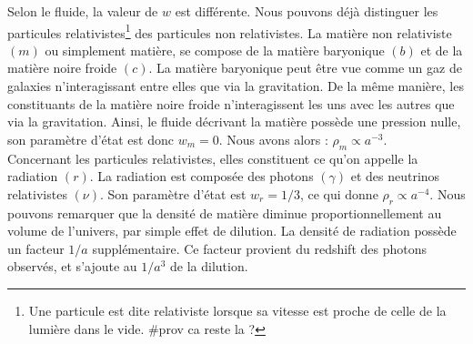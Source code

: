 \documentclass[11pt, twoside, a4paper, openright]{report}
\begin{document}
Selon le fluide, la valeur de $w$ est différente. Nous pouvons déjà distinguer les particules relativistes\footnote{Une particule est dite relativiste lorsque sa vitesse est proche de celle de la lumière dans le vide. \#prov ca reste la ?} des particules non relativistes. La matière non relativiste $(m)$ ou simplement matière, se compose de la matière baryonique $(b)$ et de la matière noire froide $(c)$.
La matière baryonique peut être vue comme un gaz de galaxies n'interagissant entre elles  que via la gravitation.
De la même manière, les constituants de la matière noire froide n'interagissent les uns avec les autres que via la gravitation.
Ainsi, le fluide décrivant la matière possède une pression nulle, son paramètre d'état est donc $w_m = 0$. Nous avons alors : $\rho_m \propto a^{-3}$. \\
Concernant les particules relativistes, elles constituent ce qu'on appelle la radiation $(r)$. La radiation est composée  des photons $(\gamma)$ et des neutrinos relativistes $(\nu)$. Son paramètre d'état est $w_r = 1/3$, ce qui donne $\rho_r \propto a^{-4}$. Nous pouvons remarquer que la densité de matière diminue proportionnellement au volume de l'univers, par simple effet de dilution. La densité de radiation possède un facteur $1/a$ supplémentaire. Ce facteur provient du redshift des photons observés, et s'ajoute au $1/a^3$ de la dilution.
\end{document}
